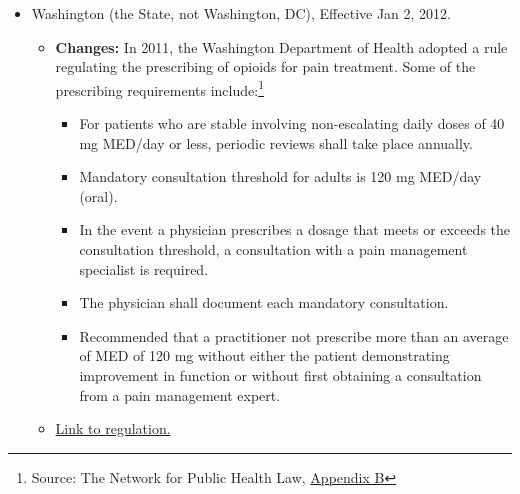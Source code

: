 \documentclass[12pt]{article}
\begin{document}
\begin{itemize}
\begin{itemize}
prescription data and history related to the patient contained in the state’s prescription drug monitoring program (PDMP)), obtaining informed consent from the patient for opioid treatment, conduct periodic review of the opioid treatment, and maintain a complete medical record of the patient’s treatment.''\footnote{Source: The Network for Public Health Law, \href{https://azdhs.gov/documents/prevention/womens-childrens-health/injury-prevention/opioid-prevention/appendix-b-state-by-state-summary.pdf}{Appendix B}}. \href{https://texreg.sos.state.tx.us/public/readtac$ext.TacPage?sl=R&app=9&p_dir=&p_rloc=&p_tloc=&p_ploc=&pg=1&p_tac=&ti=22&pt=9&ch=170&rl=3}{Link to law.}
  \end{itemize}
  \item Washington (the State, not Washington, DC), Effective Jan 2, 2012.
  \begin{itemize}
    \item \textbf{Changes:} In 2011, the Washington Department of Health adopted a rule regulating the prescribing of opioids for pain treatment. Some of the prescribing requirements include:\footnote{Source: The Network for Public Health Law, \href{https://azdhs.gov/documents/prevention/womens-childrens-health/injury-prevention/opioid-prevention/appendix-b-state-by-state-summary.pdf}{Appendix B}}
    \begin{itemize}
      \item For patients who are stable involving non-escalating daily doses of 40 mg MED/day or less, periodic reviews shall take place annually.
      \item Mandatory consultation threshold for adults is 120 mg MED/day (oral).
      \item In the event a physician prescribes a dosage that meets or exceeds the consultation
      threshold, a consultation with a pain management specialist is required.
      \item The physician shall document each mandatory consultation.
      \item Recommended that a practitioner not prescribe more than an average of MED of
      120 mg without either the patient demonstrating improvement in function or without first obtaining a consultation from a pain management expert.
    \end{itemize}
    \item \href{http://apps.leg.wa.gov/documents/laws/wsr/2011/12/11-12-025.htm}{Link to regulation.}
    \end{itemize}
\end{itemize}
\end{document}
